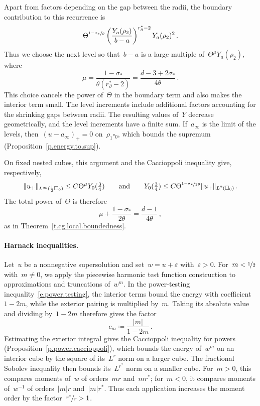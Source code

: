\documentclass[11pt,letterpaper]{article}
\numberwithin{equation}{section}
\theoremstyle{definition}
\newcommand{\eps}{\varepsilon}
\newcommand{\nf}{\nicefrac}
\newcommand{\cu}{\square}
\DeclarePairedDelimiter{\norm}{\lVert}{\rVert}
\begin{document}
Apart from factors depending on the gap between the radii, the boundary contribution to this recurrence is
\begin{equation*}
    \Theta^{\nf{1-\sigma_*}\theta}
    \left(\frac{Y_a(\rho_2)}{b-a}\right)^{r_\partial^*-2}
    Y_a(\rho_2)^2
    \,.
\end{equation*}
Thus we choose the next level so that~$b-a$ is a large multiple of~$\Theta^\mu Y_a(\rho_2)$, where
\begin{equation*}
    \mu
    =\frac{1-\sigma_*}{\theta(r_\partial^*-2)}
    =\frac{d-3+2\sigma_*}{4\theta}
    \,.
\end{equation*}
This choice cancels the power of~$\Theta$ in the boundary term and also makes the interior term small. The level increments include additional factors accounting for the shrinking gaps between radii. The resulting values of~$Y$ decrease geometrically, and the level increments have a finite sum. If~$a_\infty$ is the limit of the levels, then~$(u-a_\infty)_+=0$ on~$\rho_1\cu_0$, which bounds the supremum (Proposition~\ref{p.energy.to.sup}).

On fixed nested cubes, this argument and the Caccioppoli inequality give, respectively,
\begin{equation*}
	\norm{u_+}_{L^\infty(\frac12\cu_0)}\leq C\Theta^\mu Y_0(\tfrac34)\qquad\mbox{and}\qquad Y_0(\tfrac34)\leq C\Theta^{\nf{1-\sigma_*}{2\theta}}\norm{u_+}_{L^2(\cu_0)}\,.
\end{equation*}
The total power of~$\Theta$ is therefore
\begin{equation*}
	\mu+\frac{1-\sigma_*}{2\theta}=\frac{d-1}{4\theta}\,,
\end{equation*}
as in Theorem~\ref{t.cg.local.boundedness}.

\paragraph{Harnack inequalities.}
Let~$u$ be a nonnegative supersolution and set~$w=u+\eps$
with~$\eps>0$.
For~$m<\nf12$ with~$m\neq0$, we apply the piecewise harmonic
test function construction to approximations and truncations
of~$w^m$.
In the power-testing inequality~\eqref{e.power.testing},
the interior terms bound the energy with coefficient~$1-2m$,
while the exterior pairing is multiplied by~$m$.
Taking its absolute value and dividing by~$1-2m$ therefore
gives the factor
\begin{equation*}
    c_m\coloneqq\frac{|m|}{1-2m}
    \,.
\end{equation*}
Estimating the exterior integral gives the Caccioppoli inequality
for powers (Proposition~\ref{p.power.caccioppoli}), which bounds
the energy of~$w^m$ on an interior cube by the square of its~$L^r$ norm on a larger cube.
The fractional Sobolev inequality then bounds its~$L^{r^*}$ norm
on a smaller cube.
For~$m>0$, this compares moments of~$w$ of orders~$mr$ and~$mr^*$;
for~$m<0$, it compares moments of~$w^{-1}$ of orders~$|m|r$
and~$|m|r^*$.
Thus each application increases the moment order by the
factor~$\nf{r^*}r>1$.
\end{document}
